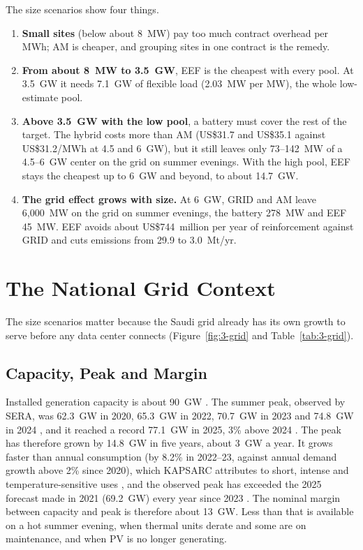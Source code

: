 The size scenarios show four things.
\begin{enumerate}
\item \textbf{Small sites} (below about 8~MW) pay too much contract overhead per MWh; AM is cheaper, and grouping sites in one contract is the remedy.
\item \textbf{From about 8~MW to 3.5~GW}, EEF is the cheapest with every pool. At 3.5~GW it needs 7.1~GW of flexible load (2.03~MW per MW), the whole low-estimate pool.
\item \textbf{Above 3.5~GW with the low pool}, a battery must cover the rest of the target. The hybrid costs more than AM (US\$31.7 and US\$35.1 against US\$31.2/MWh at 4.5 and 6~GW), but it still leaves only 73--142~MW of a 4.5--6~GW center on the grid on summer evenings. With the high pool, EEF stays the cheapest up to 6~GW and beyond, to about 14.7~GW.
\item \textbf{The grid effect grows with size.} At 6~GW, GRID and AM leave 6,000~MW on the grid on summer evenings, the battery 278~MW and EEF 45~MW. EEF avoids about US\$744~million per year of reinforcement against GRID and cuts emissions from 29.9 to 3.0~Mt/yr.
\end{enumerate}

\section{The National Grid Context}\label{sec:3-11}

The size scenarios matter because the Saudi grid already has its own growth to serve before any data center connects (Figure~\ref{fig:3-grid} and Table~\ref{tab:3-grid}).

\subsection{Capacity, Peak and Margin}

Installed generation capacity is about 90~GW \cite{v2030cap}. The summer peak, observed by SERA, was 62.3~GW in 2020, 65.3~GW in 2022, 70.7~GW in 2023 and 74.8~GW in 2024 \cite{r23}, and it reached a record 77.1~GW in 2025, 3\% above 2024 \cite{mees2026}. The peak has therefore grown by 14.8~GW in five years, about 3~GW a year. It grows faster than annual consumption (by 8.2\% in 2022--23, against annual demand growth above 2\% since 2020), which KAPSARC attributes to short, intense and temperature-sensitive uses \cite{r23}, and the observed peak has exceeded the 2025 forecast made in 2021 (69.2~GW) every year since 2023 \cite{r23}. The nominal margin between capacity and peak is therefore about 13~GW. Less than that is available on a hot summer evening, when thermal units derate and some are on maintenance, and when PV is no longer generating.

